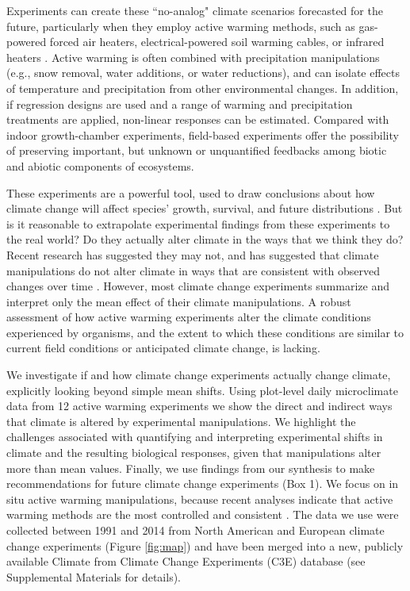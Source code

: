 \documentclass{article}
\begin{document}
\par Experiments can create these ``no-analog" climate scenarios forecasted for the future, particularly when they employ active warming methods, such as gas-powered forced air heaters, electrical-powered soil warming cables, or infrared heaters \citep{shaver2000,williams2007b,aronson2009}. Active warming is often combined with precipitation manipulations (e.g., snow removal, water additions, or water reductions), and can isolate effects of temperature and precipitation from other environmental changes\citep [e.g.,][]{price1998,cleland2006,sherry2007,rollinson2012}. In addition, if regression designs are used \citep[e.g.,][]{pelini2011} and a range of warming and precipitation treatments are applied, non-linear responses can be estimated. Compared with indoor growth-chamber experiments, field-based experiments offer the possibility of preserving important, but unknown or unquantified feedbacks among biotic and abiotic components of ecosystems. 
\par These experiments are a powerful tool, used to draw conclusions about how climate change will affect species' growth, survival, and future distributions \citep{dukes1999,hobbie1999,reich2015,gruner2016}. But is it reasonable to extrapolate experimental findings from these experiments to the real world? Do they actually alter climate in the ways that we think they do? Recent research has suggested they may not, and has suggested that climate manipulations do not alter climate in ways that are consistent with observed changes over time \citep{wolkovich2012}. However, most climate change experiments summarize and interpret only the mean effect of their climate manipulations. A robust assessment of how active warming experiments alter the climate conditions experienced by organisms, and the extent to which these conditions are similar to current field conditions or anticipated climate change, is lacking. 
\par We investigate if and how climate change experiments actually change climate, explicitly looking beyond simple mean shifts. Using plot-level daily microclimate data from 12 active warming experiments we show the direct and indirect ways that climate is altered by experimental manipulations. We highlight the challenges associated with quantifying and interpreting experimental shifts in climate and the resulting biological responses, given that manipulations alter more than mean values. Finally, we use findings from our synthesis to make recommendations for future climate change experiments (Box 1). We focus on in situ active warming manipulations, because recent analyses indicate that active warming methods are the most controlled and consistent \citep{kimball2005,kimball2008,aronson2009,wolkovich2012}. The data we use were collected between 1991 and 2014 from North American and European climate change experiments (Figure \ref{fig:map}) and have been merged into a new, publicly available Climate from Climate Change Experiments (C3E) database (see Supplemental Materials for details). 
\end{document}
